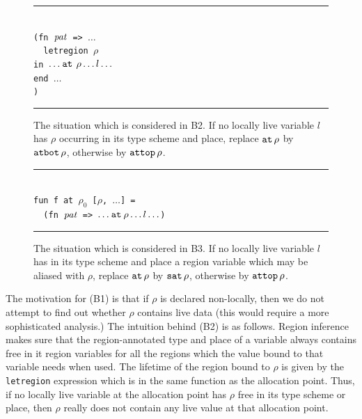 \documentclass[12pt]{book}
\begin{document}
\begin{figure}
\hrule
\begin{center}
\begin{tabbing}
\\
\hskip3cm\=\tt (fn ${\it pat}$ => $\ldots$\\
       \>\ \ \=\tt letregion $\rho$ \\
       \>    \>\tt in  $\ldots\mathbin{\hbox{\tt at}}\,\rho\ldots l \ldots$\\
       \>    \>\tt end $\ldots$\\
       \>\tt )
\end{tabbing}
\end{center}
\caption{The situation which is considered in B2. If no locally live variable
$l$ has $\rho$ occurring in its type scheme and place, 
replace $\mathbin{\hbox{\tt at}}\,\rho$ by $\hbox{\tt atbot}\,\rho$, otherwise
by $\hbox{\tt attop}\,\rho$.}
\medskip

\hrule
\label{b2.fig}
\end{figure}
\begin{figure}
\hrule
\begin{center}
\begin{tabbing}
\\
\hskip3cm\=\tt fun f at $\rho_0$ [$\rho$, $\ldots$] = \\
         \>\tt \ \ \=\tt (fn ${\it pat}$ => $\ldots\mathbin{\hbox{\tt at}}\rho\ldots l\ldots$)
\end{tabbing}
\end{center}
\caption{The situation which is considered in B3. If no locally live variable
$l$ has in its type scheme and place a region variable which may be
aliased with $\rho$,  replace $\mathbin{\hbox{\tt at}}\,\rho$ by $\hbox{\tt sat}\,\rho$, otherwise
by $\hbox{\tt attop}\,\rho$.}
\medskip

\hrule
\label{b3.fig}
\end{figure}
The motivation for (B1) is that if $\rho$ is declared non-locally,
then we do not attempt to find out whether $\rho$ contains live data (this would
require a more sophisticated analysis.) 
The intuition behind (B2) is as follows. Region inference
makes sure that the region-annotated type and place of a variable always contains
free in it region variables for all the regions which the value bound to that
variable needs when used. The lifetime of the region bound to 
$\rho$ is given by the {\tt letregion} expression which is in the same function
as the allocation point. Thus,  
if no locally live variable at the allocation point
has $\rho$ free in its type scheme 
or place, then $\rho$ really does not contain any
live value at that allocation point.
\end{document}
